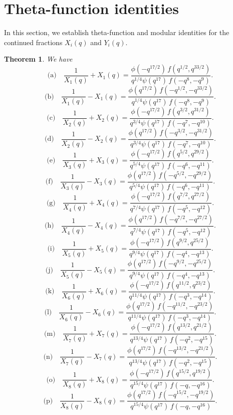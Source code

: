 \documentclass[11pt,a4paper]{article}
\numberwithin{equation}{section}
\theoremstyle{plain}
\newtheorem{theorem}{Theorem}[section]
\begin{document}
	\section{Theta-function identities}
	
	In this section, we establish theta-function and modular identities for the continued fractions $X_i(q)$ and $Y_i(q)$.
	
	\begin{theorem}
		We have
		\[
		\text{(a)}\quad 
		\frac{1}{X_1(q)} + X_1(q)
		= \frac{\phi(-q^{17/2})\, f(q^{1/2}, q^{33/2})}
		{q^{1/4}\psi(q^{17})\, f(-q^{8},-q^{9})}.
		\]
		\[
		\text{(b)}\quad 
		\frac{1}{X_1(q)} - X_1(q)
		= \frac{\phi(q^{17/2})\, f(-q^{1/2}, -q^{33/2})}
		{q^{1/4}\psi(q^{17})\, f(-q^{8},-q^{9})}.
		\]
		\[
		\text{(c)}\quad 
		\frac{1}{X_2(q)} + X_2(q)
		= \frac{\phi(-q^{17/2})\, f(q^{3/2}, q^{31/2})}
		{q^{3/4}\psi(q^{17})\, f(-q^{7},-q^{10})}.
		\]
		\[
		\text{(d)}\quad 
		\frac{1}{X_2(q)} - X_2(q)
		= \frac{\phi(q^{17/2})\, f(-q^{3/2},-q^{31/2})}
		{q^{3/4}\psi(q^{17})\, f(-q^{7},-q^{10})}.
		\]
		\[
		\text{(e)}\quad 
		\frac{1}{X_3(q)} + X_3(q)
		= \frac{\phi(-q^{17/2})\, f(q^{5/2}, q^{29/2})}
		{q^{5/4}\psi(q^{17})\, f(-q^{6},-q^{11})}.
		\]
		\[
		\text{(f)}\quad 
		\frac{1}{X_3(q)} - X_3(q)
		= \frac{\phi(q^{17/2})\, f(-q^{5/2},-q^{29/2})}
		{q^{5/4}\psi(q^{17})\, f(-q^{6},-q^{11})}.
		\]
		\[
		\text{(g)}\quad 
		\frac{1}{X_4(q)} + X_4(q)
		= \frac{\phi(-q^{17/2})\, f(q^{7/2}, q^{27/2})}
		{q^{7/4}\psi(q^{17})\, f(-q^{5},-q^{12})}.
		\]
		\[
		\text{(h)}\quad 
		\frac{1}{X_4(q)} - X_4(q)
		= \frac{\phi(q^{17/2})\, f(-q^{7/2},-q^{27/2})}
		{q^{7/4}\psi(q^{17})\, f(-q^{5},-q^{12})}.
		\]
		\[
		\text{(i)}\quad 
		\frac{1}{X_5(q)} + X_5(q)
		= \frac{\phi(-q^{17/2})\, f(q^{9/2}, q^{25/2})}
		{q^{9/4}\psi(q^{17})\, f(-q^{4},-q^{13})}.
		\]
		\[
		\text{(j)}\quad 
		\frac{1}{X_5(q)} - X_5(q)
		= \frac{\phi(q^{17/2})\, f(-q^{9/2},-q^{25/2})}
		{q^{9/4}\psi(q^{17})\, f(-q^{4},-q^{13})}.
		\]
		\[
		\text{(k)}\quad 
		\frac{1}{X_6(q)} + X_6(q)
		= \frac{\phi(-q^{17/2})\, f(q^{11/2}, q^{23/2})}
		{q^{11/4}\psi(q^{17})\, f(-q^{3},-q^{14})}.
		\]
		\[
		\text{(l)}\quad 
		\frac{1}{X_6(q)} - X_6(q)
		= \frac{\phi(q^{17/2})\, f(-q^{11/2},-q^{23/2})}
		{q^{11/4}\psi(q^{17})\, f(-q^{3},-q^{14})}.
		\]
		\[
		\text{(m)}\quad 
		\frac{1}{X_7(q)} + X_7(q)
		= \frac{\phi(-q^{17/2})\, f(q^{13/2}, q^{21/2})}
		{q^{13/4}\psi(q^{17})\, f(-q^{2},-q^{15})}.
		\]
		\[
		\text{(n)}\quad 
		\frac{1}{X_7(q)} - X_7(q)
		= \frac{\phi(q^{17/2})\, f(-q^{13/2},-q^{21/2})}
		{q^{13/4}\psi(q^{17})\, f(-q^{2},-q^{15})}.
		\]
		\[
		\text{(o)}\quad 
		\frac{1}{X_8(q)} + X_8(q)
		= \frac{\phi(-q^{17/2})\, f(q^{15/2}, q^{19/2})}
		{q^{15/4}\psi(q^{17})\, f(-q,-q^{16})}.
		\]
		\[
		\text{(p)}\quad 
		\frac{1}{X_8(q)} - X_8(q)
		= \frac{\phi(q^{17/2})\, f(-q^{15/2},-q^{19/2})}
		{q^{15/4}\psi(q^{17})\, f(-q,-q^{16})}.
		\]
		
	\end{theorem}
	
\end{document}
